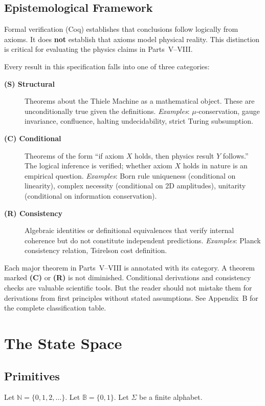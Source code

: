 \documentclass[11pt, a4paper]{report}
\theoremstyle{definition}
\theoremstyle{plain}
\newcommand{\N}{\mathbb{N}}
\newcommand{\B}{\mathbb{B}}
\begin{document}
\section{Epistemological Framework}

Formal verification (Coq) establishes that conclusions follow logically from axioms. It does \textbf{not} establish that axioms model physical reality. This distinction is critical for evaluating the physics claims in Parts~V--VIII.

Every result in this specification falls into one of three categories:

\begin{description}
    \item[\textbf{(S) Structural}] Theorems about the Thiele Machine as a mathematical object. These are unconditionally true given the definitions. \emph{Examples}: $\mu$-conservation, gauge invariance, confluence, halting undecidability, strict Turing subsumption.

    \item[\textbf{(C) Conditional}] Theorems of the form ``if axiom $X$ holds, then physics result $Y$ follows.'' The logical inference is verified; whether axiom $X$ holds in nature is an empirical question. \emph{Examples}: Born rule uniqueness (conditional on linearity), complex necessity (conditional on 2D amplitudes), unitarity (conditional on information conservation).

    \item[\textbf{(R) Consistency}] Algebraic identities or definitional equivalences that verify internal coherence but do not constitute independent predictions. \emph{Examples}: Planck consistency relation, Tsirelson cost definition.
\end{description}

Each major theorem in Parts~V--VIII is annotated with its category. A theorem marked \textbf{(C)} or \textbf{(R)} is not diminished. Conditional derivations and consistency checks are valuable scientific tools. But the reader should not mistake them for derivations from first principles without stated assumptions. See Appendix~B for the complete classification table.

\chapter{The State Space}

\section{Primitives}
Let $\N = \{0,1,2,\dots\}$. Let $\B = \{0,1\}$. Let $\Sigma$ be a finite alphabet.
\end{document}
